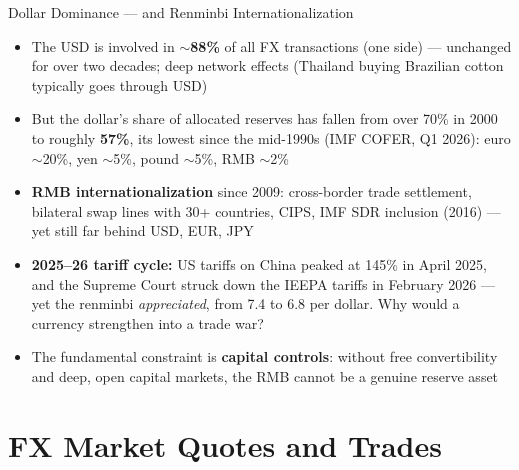 \documentclass[aspectratio=169]{beamer}
\begin{document}
\begin{frame}{Dollar Dominance --- and Renminbi Internationalization}
\begin{itemize}
  \item The USD is involved in $\sim$\textbf{88\%} of all FX transactions (one side) --- unchanged for over two decades; deep network effects (Thailand buying Brazilian cotton typically goes through USD)
  \item But the dollar's share of allocated reserves has fallen from over 70\% in 2000 to roughly \textbf{57\%}, its lowest since the mid-1990s (IMF COFER, Q1 2026): euro $\sim$20\%, yen $\sim$5\%, pound $\sim$5\%, RMB $\sim$2\%
  \item \textbf{RMB internationalization} since 2009: cross-border trade settlement, bilateral swap lines with 30+ countries, CIPS, IMF SDR inclusion (2016) --- yet still far behind USD, EUR, JPY
  \item \textbf{2025--26 tariff cycle:} US tariffs on China peaked at 145\% in April 2025, and the Supreme Court struck down the IEEPA tariffs in February 2026 --- yet the renminbi \emph{appreciated}, from 7.4 to 6.8 per dollar. Why would a currency strengthen into a trade war?
  \item The fundamental constraint is \textbf{capital controls}: without free convertibility and deep, open capital markets, the RMB cannot be a genuine reserve asset
\end{itemize}
\end{frame}


\section{FX Market Quotes and Trades}
\end{document}
